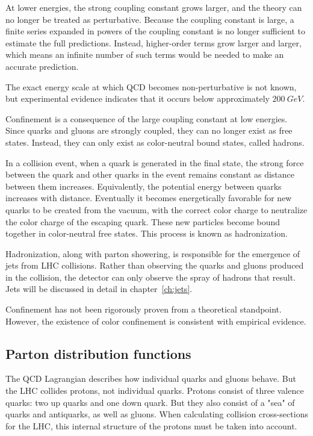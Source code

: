 At lower energies, the strong coupling constant grows larger, and the theory can no longer be treated as perturbative.
Because the coupling constant is large,
a finite series expanded in powers of the coupling constant is no longer sufficient to estimate the full predictions.
Instead, higher-order terms grow larger and larger, which means an infinite number of such terms would be needed to make an accurate prediction.

The exact energy scale at which QCD becomes non-perturbative is not known,
but experimental evidence indicates that it occurs below approximately $200~GeV$.

Confinement is a consequence of the large coupling constant at low energies.
Since quarks and gluons are strongly coupled, they can no longer exist as free states.
Instead, they can only exist as color-neutral bound states, called hadrons.

In a collision event, when a quark is generated in the final state,
the strong force between the quark and other quarks in the event remains constant as distance between them increases.
Equivalently, the potential energy between quarks increases with distance.
Eventually it becomes energetically favorable for new quarks to be created from the vacuum,
with the correct color charge to neutralize the color charge of the escaping quark.
These new particles become bound together in color-neutral free states.
This process is known as hadronization.

Hadronization, along with parton showering, is responsible for the emergence of jets from LHC collisions.
Rather than observing the quarks and gluons produced in the collision,
the detector can only observe the spray of hadrons that result.
Jets will be discussed in detail in chapter~\ref{ch:jets}.

Confinement has not been rigorously proven from a theoretical standpoint.
However, the existence of color confinement is consistent with empirical evidence.

\subsection{Parton distribution functions}\label{subsec:qcd_pdfs}

The QCD Lagrangian describes how individual quarks and gluons behave.
But the LHC collides protons, not individual quarks.
Protons consist of three valence quarks: two up quarks and one down quark.
But they also consist of a "sea" of quarks and antiquarks, as well as gluons.
When calculating collision cross-sections for the LHC, this internal structure of the protons must be taken into account.

